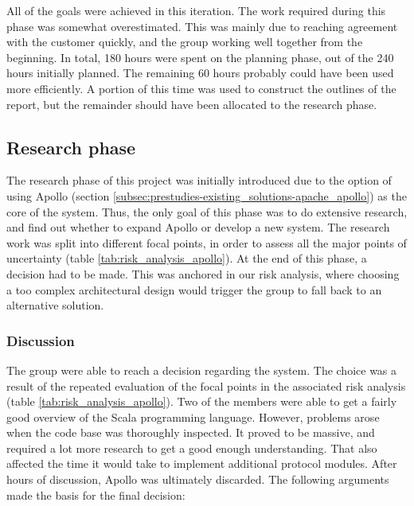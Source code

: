 All of the goals were achieved in this iteration. The work required during this phase was somewhat overestimated. This was mainly due to reaching agreement with the customer quickly, and the group working well together from the beginning. In total, 180 hours were spent on the planning phase, out of the 240 hours initially planned. The remaining 60 hours probably could have been used more efficiently. A portion of this time was used to construct the outlines of the report, but the remainder should have been allocated to the research phase. 

\subsection{Research phase}
\label{subsec:project_lifecycle-planning_and_research-research_phase}

The research phase of this project was initially introduced due to the option of using Apollo (section \ref{subsec:prestudies-existing_solutions-apache_apollo}) as the core of the system. Thus, the only goal of this phase was to do extensive research, and find out whether to expand Apollo or develop a new system. The research work was split into different focal points, in order to assess all the major points of uncertainty (table \ref{tab:risk_analysis_apollo}). At the end of this phase, a decision had to be made. This was anchored in our risk analysis, where choosing a too complex architectural design would trigger the group to fall back to an alternative solution.

\subsubsection{Discussion}
\label{subsec:project_lifecycle-planning_and_research-research_phase-discussion}

The group were able to reach a decision regarding the system. The choice was a result of the repeated evaluation of the focal points in the associated risk analysis (table \ref{tab:risk_analysis_apollo}). Two of the members were able to get a fairly good overview of the Scala programming language. However, problems arose when the code base was thoroughly inspected. It proved to be massive, and required a lot more research to get a good enough understanding. That also affected the time it would take to implement additional protocol modules. After hours of discussion, Apollo was ultimately discarded. The following arguments made the basis for the final decision:

